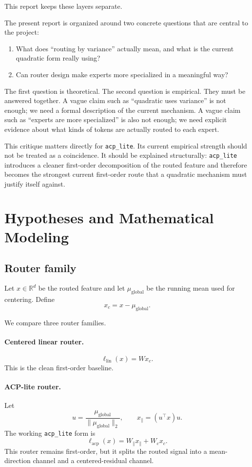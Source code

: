 \documentclass[11pt]{article}
\begin{document}
This report keeps these layers separate.

The present report is organized around two concrete questions that are central to the project:
\begin{enumerate}
    \item What does ``routing by variance'' actually mean, and what is the current quadratic form really using?
    \item Can router design make experts more specialized in a meaningful way?
\end{enumerate}

The first question is theoretical. The second question is empirical. They must be answered together. A vague claim such as ``quadratic uses variance'' is not enough; we need a formal description of the current mechanism. A vague claim such as ``experts are more specialized'' is also not enough; we need explicit evidence about what kinds of tokens are actually routed to each expert.

This critique matters directly for \texttt{acp\_lite}. Its current empirical strength should not be treated as a coincidence. It should be explained structurally: \texttt{acp\_lite} introduces a cleaner first-order decomposition of the routed feature and therefore becomes the strongest current first-order route that a quadratic mechanism must justify itself against.

\section{Hypotheses and Mathematical Modeling}

\subsection{Router family}

Let $x \in \mathbb{R}^d$ be the routed feature and let $\mu_{\mathrm{global}}$ be the running mean used for centering. Define
\[
x_c = x - \mu_{\mathrm{global}}.
\]

We compare three router families.

\paragraph{Centered linear router.}
\[
\ell_{\mathrm{lin}}(x) = W x_c.
\]
This is the clean first-order baseline.

\paragraph{ACP-lite router.}
Let
\[
u = \frac{\mu_{\mathrm{global}}}{\|\mu_{\mathrm{global}}\|_2},
\qquad
x_{\parallel} = (u^\top x)u.
\]
The working \texttt{acp\_lite} form is
\[
\ell_{\mathrm{acp}}(x) = W_{\parallel}x_{\parallel} + W_c x_c.
\]
This router remains first-order, but it splits the routed signal into a mean-direction channel and a centered-residual channel.
\end{document}

